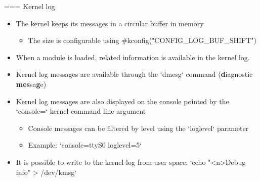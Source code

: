 === Kernel log
  \begin{itemize}
  \item The kernel keeps its messages in a circular buffer in memory
    \begin{itemize}
    \item The size is configurable using #kconfig("CONFIG_LOG_BUF_SHIFT")
    \end{itemize}
  \item When a module is loaded, related information is available in the
    kernel log.
  \item Kernel log messages are available through the `dmesg`
    command ({\bf d}iagnostic {\bf mes}sa{\bf g}e)
  \item Kernel log messages are also displayed on the console pointed by
    the `console=` kernel command line argument
    \begin{itemize}
    \item Console messages can be filtered by level using the
      `loglevel` parameter
    \item Example: `console=ttyS0 loglevel=5`
    \end{itemize}
  \item It is possible to write to the kernel log from user space:
  `echo "<n>Debug info" > /dev/kmsg`
  \end{itemize}

